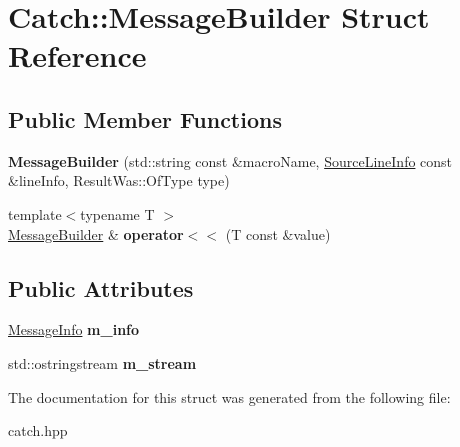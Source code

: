 \hypertarget{structCatch_1_1MessageBuilder}{
\section{Catch::MessageBuilder Struct Reference}
\label{structCatch_1_1MessageBuilder}
}
\subsection*{Public Member Functions}
\begin{DoxyCompactItemize}
\item 
\hypertarget{structCatch_1_1MessageBuilder_ab0c6378e722680bf58852c6ee2b6e724}{
{\bfseries MessageBuilder} (std::string const \&macroName, \hyperlink{structCatch_1_1SourceLineInfo}{SourceLineInfo} const \&lineInfo, ResultWas::OfType type)}
\label{structCatch_1_1MessageBuilder_ab0c6378e722680bf58852c6ee2b6e724}

\item 
\hypertarget{structCatch_1_1MessageBuilder_aadce2f48d990005bed7cf223e4046a6b}{
{\footnotesize template$<$typename T $>$ }\\\hyperlink{structCatch_1_1MessageBuilder}{MessageBuilder} \& {\bfseries operator$<$$<$} (T const \&value)}
\label{structCatch_1_1MessageBuilder_aadce2f48d990005bed7cf223e4046a6b}

\end{DoxyCompactItemize}
\subsection*{Public Attributes}
\begin{DoxyCompactItemize}
\item 
\hypertarget{structCatch_1_1MessageBuilder_a979f1c2b36d78f80ee275bfa5ba0209f}{
\hyperlink{structCatch_1_1MessageInfo}{MessageInfo} {\bfseries m\_\-info}}
\label{structCatch_1_1MessageBuilder_a979f1c2b36d78f80ee275bfa5ba0209f}

\item 
\hypertarget{structCatch_1_1MessageBuilder_a6488ab0cc4ea52affc9c0612c7c5df6b}{
std::ostringstream {\bfseries m\_\-stream}}
\label{structCatch_1_1MessageBuilder_a6488ab0cc4ea52affc9c0612c7c5df6b}

\end{DoxyCompactItemize}


The documentation for this struct was generated from the following file:\begin{DoxyCompactItemize}
\item 
catch.hpp\end{DoxyCompactItemize}
